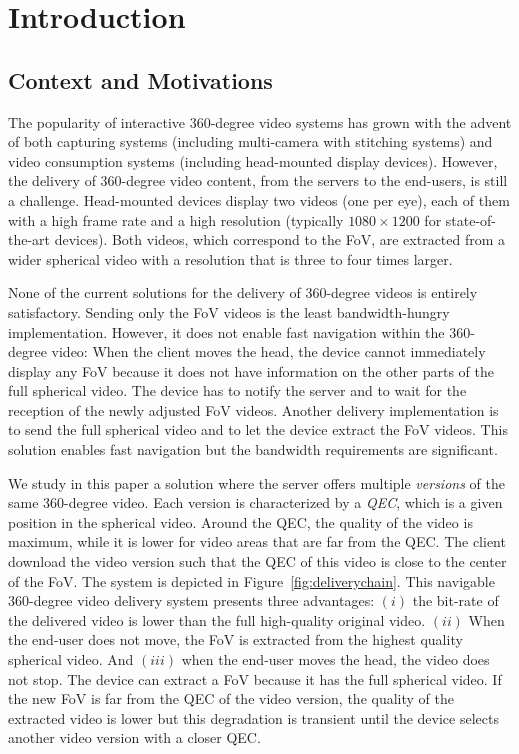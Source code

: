 \section{Introduction}
\label{sec:introduction}

\subsection{Context and Motivations}

The popularity of interactive 360-degree video systems 
has grown with the advent of both capturing systems
(including multi-camera with stitching systems) and video
consumption systems (including head-mounted display devices).
However, the delivery of 360-degree video content, from the servers
to the end-users,
is still a challenge. Head-mounted devices display two videos (one per
eye), each of them with a high frame rate and a high resolution (typically 
$1080\times 1200$ for state-of-the-art devices). Both videos, which 
correspond to the \ac{FoV}, are extracted
from a wider spherical video with a resolution that is three to four times larger.

None of the current solutions for the delivery of 360-degree videos is entirely 
satisfactory. Sending only 
the \ac{FoV} videos is the least bandwidth-hungry implementation. However, it does 
not enable fast
navigation within the 360-degree video: When the client moves the head, the device cannot 
immediately display any \ac{FoV} because it does not have information on the other
parts of the full spherical video. The device has to notify the server and to wait 
for the reception of the 
newly adjusted \ac{FoV} videos. Another delivery implementation is to send the full spherical video 
and to let the device
extract the \ac{FoV} videos. This solution enables fast navigation but the bandwidth requirements are 
significant.

We study in this paper a solution where the server offers multiple \emph{versions} of the same 
360-degree video. Each version is characterized by a \emph{\ac{QEC}}, which is a given 
position in the spherical video. Around the \ac{QEC}, the quality of the video is maximum,
while it is lower for video areas that are far from the \ac{QEC}.
The client download the video version
such that  
the \ac{QEC} of this video is close to the center of the \ac{FoV}.
The system is depicted in Figure~\ref{fig:deliverychain}.
This navigable 360-degree video delivery system presents three advantages:
$(i)$ the bit-rate of the delivered video is lower than the full high-quality original video.
$(ii)$ When the end-user does not move, the \ac{FoV} is extracted from the highest 
quality spherical video.
And $(iii)$ when the end-user moves the head, the video does not stop. The device can 
extract 
a \ac{FoV} because it has the full spherical video. If the new \ac{FoV} is far from the 
\ac{QEC} of the video version, the quality of the extracted video is lower but this
degradation is transient until the 
device selects another video version with a closer \ac{QEC}.

